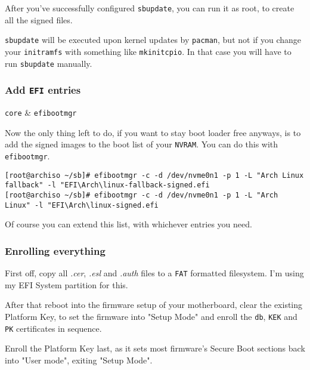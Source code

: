 \documentclass[10pt]{dustdoc}
\begin{document}
After you’ve successfully configured \texttt{sbupdate}, you can run it as root, to create all the signed files.

\begin{NOTE}
    \texttt{sbupdate} will be executed upon kernel updates by \texttt{pacman}, but not if you change your \texttt{initramfs} with something like \texttt{mkinitcpio}.
    In that case you will have to run \texttt{sbupdate} manually.
\end{NOTE}

\subsubsection{Add \texttt{EFI} entries}
\label{sec:add-efi-entries}

\begin{packagetable}
    \texttt{core} & \texttt{efibootmgr} \\
\end{packagetable}

Now the only thing left to do, if you want to stay boot loader free anyways, is to add the signed images to the boot list of your \texttt{NVRAM}.
You can do this with \texttt{efibootmgr}.

\begin{verbatim}
[root@archiso ~/sb]# efibootmgr -c -d /dev/nvme0n1 -p 1 -L "Arch Linux fallback" -l "EFI\Arch\linux-fallback-signed.efi
[root@archiso ~/sb]# efibootmgr -c -d /dev/nvme0n1 -p 1 -L "Arch Linux" -l "EFI\Arch\linux-signed.efi
\end{verbatim}

Of course you can extend this list, with whichever entries you need.

\subsubsection{Enrolling everything}
\label{sec:enrolling-everything}

First off, copy all \textit{.cer}, \textit{.esl} and \textit{.auth} files to a \texttt{FAT} formatted filesystem.
I’m using my EFI System partition for this.

After that reboot into the firmware setup of your motherboard, clear the existing Platform Key, to set the firmware into "Setup Mode" and enroll the \texttt{db}, \texttt{KEK} and \texttt{PK} certificates in sequence.

\begin{NOTE}
    Enroll the Platform Key last, as it sets most firmware’s Secure Boot sections back into "User mode", exiting "Setup Mode".
\end{NOTE}
\end{document}
